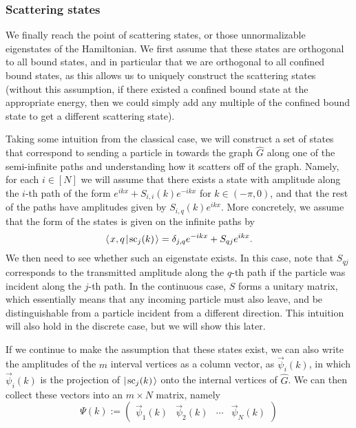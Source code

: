 \documentclass[../thesis-main/thesis-main]{subfiles}
\begin{document}
\subsubsection{Scattering states}

We finally reach the point of scattering states, or those unnormalizable eigenstates of the Hamiltonian.  We first assume that these states are orthogonal to all bound states, and in particular that we are orthogonal to all confined bound states, as this allows us to uniquely construct the scattering states (without this assumption, if there existed a confined bound state at the appropriate energy, then we could simply add any multiple of the confined bound state to get a different scattering state).

Taking some intuition from the classical case, we will construct a set of states that correspond to sending a particle in towards the graph $\widehat{G}$ along one of the semi-infinite paths and understanding how it scatters off of the graph.  Namely, for each $i\in[N]$ we will assume that there exists a state with amplitude along the $i$-th path of the form $e^{i k x} + S_{i,i}(k)e^{-i k x}$ for $k\in (-\pi, 0)$, and that the rest of the paths have amplitudes given by $S_{i,q}(k)e^{ikx}$.  More concretely, we assume that the form of the states is given on the infinite paths by
\begin{equation}
  \langle\mspace{2mu} x,q \mspace{2mu} | \mspace{2mu} \text{sc}_{j}(k)\mspace{2mu} \rangle = \delta_{j,q} e^{-i k x} + S_{qj} e^{i k x}.\label{eq:scattering_amplitude_paths}
\end{equation}
We then need to see whether such an eigenstate exists.  In this case, note that $S_{qj}$ corresponds to the transmitted amplitude along the $q$-th path if the particle was incident along the $j$-th path.  In the continuous case, $S$ forms a unitary matrix, which essentially means that any incoming particle must also leave, and be distinguishable from a particle incident from a different direction.  This intuition will also hold in the discrete case, but we will show this later.

If we continue to make the assumption that these states exist, we can also write the amplitudes of the $m$ interval vertices as a column vector, as $\vec{\psi}_i(k)$, in which $\vec{\psi}_{i}(k)$ is the projection of $|\mspace{2mu} \text{sc}_j(k) \mspace{2mu} \rangle$ onto the internal vertices of $\widehat{G}$.  We can then collect these vectors into an $m\times N$ matrix, namely
\begin{equation}
  \Psi(k) := \begin{pmatrix} \vec{\psi}_1(k) & \vec{\psi}_2(k) & \cdots & \vec{\psi}_N(k)\end{pmatrix}
\end{equation}
\end{document}
